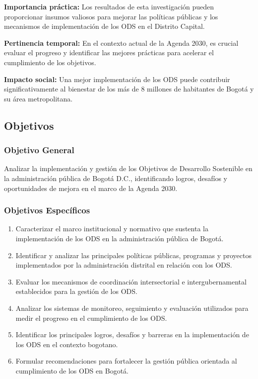 \textbf{Importancia práctica:} Los resultados de esta investigación pueden proporcionar insumos valiosos para mejorar las políticas públicas y los mecanismos de implementación de los ODS en el Distrito Capital.

\textbf{Pertinencia temporal:} En el contexto actual de la Agenda 2030, es crucial evaluar el progreso y identificar las mejores prácticas para acelerar el cumplimiento de los objetivos.

\textbf{Impacto social:} Una mejor implementación de los ODS puede contribuir significativamente al bienestar de los más de 8 millones de habitantes de Bogotá y su área metropolitana.

\subsection{Objetivos}

\subsubsection{Objetivo General}

Analizar la implementación y gestión de los Objetivos de Desarrollo Sostenible en la administración pública de Bogotá D.C., identificando logros, desafíos y oportunidades de mejora en el marco de la Agenda 2030.

\subsubsection{Objetivos Específicos}

\begin{enumerate}
    \item Caracterizar el marco institucional y normativo que sustenta la implementación de los ODS en la administración pública de Bogotá.
    
    \item Identificar y analizar las principales políticas públicas, programas y proyectos implementados por la administración distrital en relación con los ODS.
    
    \item Evaluar los mecanismos de coordinación intersectorial e intergubernamental establecidos para la gestión de los ODS.
    
    \item Analizar los sistemas de monitoreo, seguimiento y evaluación utilizados para medir el progreso en el cumplimiento de los ODS.
    
    \item Identificar los principales logros, desafíos y barreras en la implementación de los ODS en el contexto bogotano.
    
    \item Formular recomendaciones para fortalecer la gestión pública orientada al cumplimiento de los ODS en Bogotá.
\end{enumerate}

